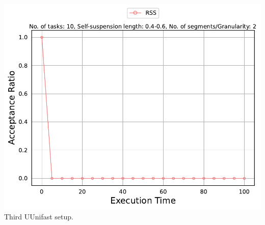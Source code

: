 \documentclass[]{article}
\begin{document}
\begin{minipage}[t]{0.48\linewidth}
		\includegraphics[width=\linewidth]{RSS[2][0.4-0.6][10].pdf}
		Third UUnifast setup.
		\vspace{0.3cm}
		
		
	\end{minipage}\hfill
\end{document}
